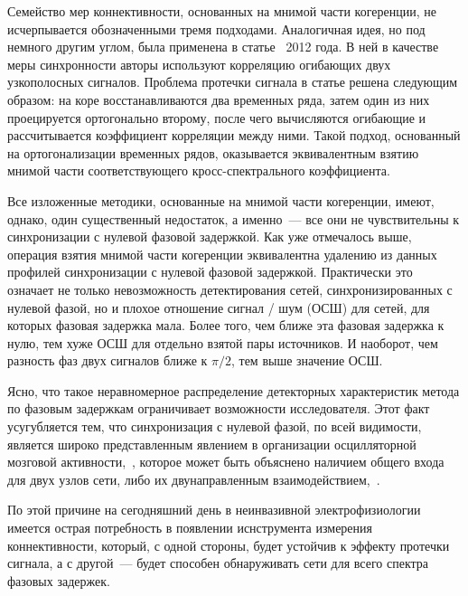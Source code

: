 Семейство мер коннективности, основанных на мнимой части когеренции, не
исчерпывается обозначенными тремя подходами. Аналогичная идея, но под немного
другим углом, была применена в статье~\cite{Hipp2012} 2012 года. В ней в
качестве меры синхронности авторы используют корреляцию огибающих двух
узкополосных сигналов. Проблема протечки сигнала в статье решена следующим
образом: на коре восстанавливаются два временных ряда, затем один из них
проецируется ортогонально второму, после чего вычисляются огибающие и
рассчитывается коэффициент корреляции между ними.  Такой подход, основанный на
ортогонализации временных рядов, оказывается эквивалентным взятию мнимой части
соответствующего кросс-спектрального коэффициента.



Все изложенные методики, основанные на мнимой части когеренции, имеют, однако,
один существенный недостаток, а именно~--- все они не чувствительны к
синхронизации с нулевой фазовой задержкой. Как уже отмечалось выше, операция
взятия мнимой части когеренции эквивалентна удалению из данных профилей
синхронизации с нулевой фазовой задержкой. Практически это означает не только
невозможность детектирования сетей, синхронизированных с нулевой фазой, но и
плохое отношение сигнал / шум (ОСШ) для сетей, для которых фазовая задержка
мала. Более того, чем ближе эта фазовая задержка к нулю, тем хуже ОСШ для отдельно взятой пары
источников.
И наоборот, чем разность фаз двух сигналов ближе к $\pi / 2$, тем выше значение ОСШ.

Ясно, что такое неравномерное распределение детекторных характеристик метода по
фазовым задержкам ограничивает возможности исследователя.
Этот факт усугубляется тем, что
синхронизация с нулевой фазой, по всей видимости, является широко представленным
явлением в организации осцилляторной мозговой активности,~\cite{roelfsema, Singer1999, Engel2001},
которое может быть объяснено наличием общего входа для двух узлов сети, либо
их двунаправленным взаимодействием,~\cite{rajagovindan}.

По этой причине на сегодняшний день в неинвазивной электрофизиологии имеется
острая потребность в появлении иснструмента измерения коннективности, который,
с одной стороны, будет устойчив к эффекту протечки сигнала, а с другой~---
будет способен обнаруживать сети для всего спектра фазовых задержек.


